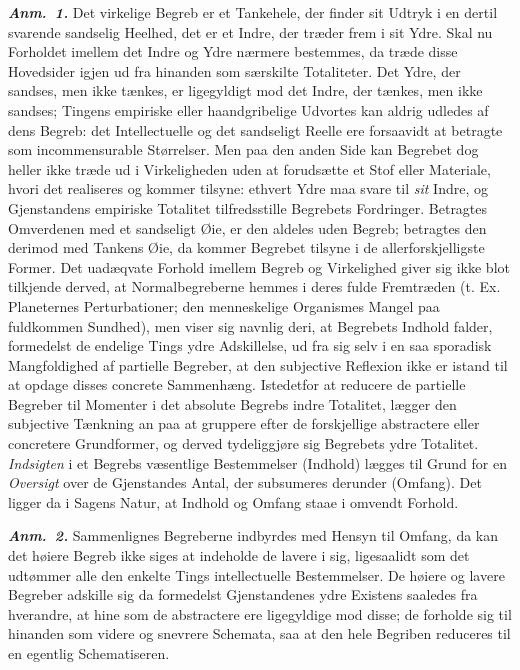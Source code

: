 \documentclass[12pt]{book}
\newcommand{\anm}[1]{\emph{\textbf{Anm.~#1.}}}
\newcommand{\opage}[1]{\marginnote{\footnotesize\textit{[#1]}}}
\begin{document}
\anm{1} Det virkelige Begreb er et Tankehele, der finder sit Udtryk i en
dertil svarende sandselig Heelhed, det er et Indre, der træder frem i sit
Ydre. Skal nu Forholdet imellem det Indre og Ydre nærmere bestemmes, da træde
disse Hovedsider igjen ud fra hinanden som særskilte Totaliteter. Det Ydre,
der sandses, men ikke tænkes, er ligegyldigt mod
\opage{28} %
det Indre, der tænkes, men ikke sandses; Tingens empiriske eller
haandgribelige Udvortes kan aldrig udledes af dens Begreb: det Intellectuelle
og det sandseligt Reelle ere forsaavidt at betragte som incommensurable
Størrelser. Men paa den anden Side kan Begrebet dog heller ikke træde ud i
Virkeligheden uden at forudsætte et Stof eller Materiale, hvori det realiseres
og kommer tilsyne: ethvert Ydre maa svare til \emph{sit} Indre, og
Gjenstandens empiriske Totalitet tilfredsstille Begrebets Fordringer.
Betragtes Omverdenen med et sandseligt Øie, er den aldeles uden Begreb;
betragtes den derimod med Tankens Øie, da kommer Begrebet tilsyne i de
allerforskjelligste Former. Det uadæqvate Forhold imellem Begreb og
Virkelighed giver sig ikke blot tilkjende derved, at Normalbegreberne hemmes i
deres fulde Fremtræden (t. Ex. Planeternes Perturbationer; den menneskelige
Organismes Mangel paa fuldkommen Sundhed), men viser sig navnlig deri, at
Begrebets Indhold falder, formedelst de endelige Tings ydre Adskillelse, ud
fra sig selv i en saa sporadisk Mangfoldighed af partielle Begreber, at den
subjective Reflexion ikke er istand til at opdage disses concrete Sammenhæng.
Istedetfor at reducere de partielle Begreber til Momenter i det absolute
Begrebs indre Totalitet, lægger den subjective Tænkning an paa at gruppere
efter de forskjellige abstractere eller concretere Grundformer, og derved
tydeliggjøre sig Begrebets ydre Totalitet. \emph{Indsigten} i et Begrebs
væsentlige Bestemmelser (Indhold) lægges til Grund for en \emph{Oversigt} over
de Gjenstandes Antal, der subsumeres derunder (Omfang). Det ligger da i Sagens
Natur, at Indhold og Omfang staae i omvendt Forhold.

\anm{2} Sammenlignes Begreberne indbyrdes med Hensyn til Omfang, da kan det
høiere Begreb ikke siges at
\opage{29} indeholde de lavere i sig, ligesaalidt som det udtømmer alle den enkelte Tings
intellectuelle Bestemmelser. De høiere og lavere Begreber adskille sig da
formedelst Gjenstandenes ydre Existens saaledes fra hverandre, at hine som de
abstractere ere ligegyldige mod disse; de forholde sig til hinanden som videre
og snevrere Schemata, saa at den hele Begriben reduceres til en egentlig
Schematiseren.
\end{document}
